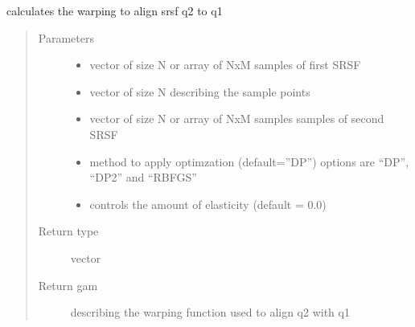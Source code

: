 \documentclass[letterpaper,10pt,english]{sphinxmanual}
\begin{document}
\begin{fulllineitems}
\label{\detokenize{utility_functions:utility_functions.optimum_reparam}}
calculates the warping to align srsf q2 to q1
\begin{quote}\begin{description}
\item[{Parameters}] \leavevmode\begin{itemize}
\item {} 
 \textendash{} vector of size N or array of NxM samples of first SRSF

\item {} 
 \textendash{} vector of size N describing the sample points

\item {} 
 \textendash{} vector of size N or array of NxM samples samples of second SRSF

\item {} 
 \textendash{} method to apply optimzation (default=”DP”) options are “DP”, “DP2” and “RBFGS”

\item {} 
 \textendash{} controls the amount of elasticity (default = 0.0)

\end{itemize}

\item[{Return type}] \leavevmode
vector

\item[{Return gam}] \leavevmode
describing the warping function used to align q2 with q1

\end{description}\end{quote}

\end{fulllineitems}

\end{document}
